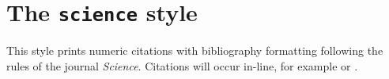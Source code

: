 \documentclass[a4paper]{article}
\begin{document}
\section*{The \texttt{science} style}

This style prints numeric citations with bibliography
formatting following the rules of the journal \emph{Science}.
Citations will occur in-line, for example \autocite{Kabbe1973} 
or \autocite{Arduengo1991}.

\nocite{*}

\printbibliography
\end{document}
